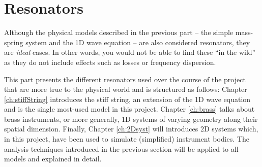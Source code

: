 \chapter*{Resonators}
Although the physical models described in the previous part -- the simple mass-spring system and the 1D wave equation -- are also considered resonators, they are \textit{ideal} cases. In other words, you would not be able to find these ``in the wild'' as they do not include effects such as losses or frequency dispersion. 

This part presents the different resonators used over the course of the project that are more true to the physical world and is structured as follows: Chapter \ref{ch:stiffString} introduces the stiff string, an extension of the 1D wave equation and is the single most-used model in this project. Chapter \ref{ch:brass} talks about brass instruments, or more generally, 1D systems of varying geometry along their spatial dimension. Finally, Chapter \ref{ch:2Dsyst} will introduces 2D systems which, in this project, have been used to simulate (simplified) instrument bodies. The analysis techniques introduced in the previous section will be applied to all models and explained in detail. 